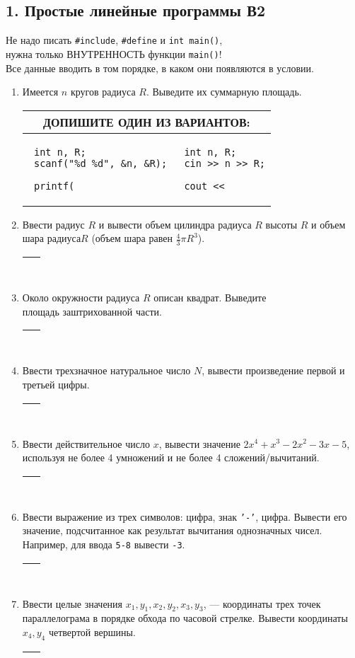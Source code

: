 \documentclass{article}
\newcommand{\answerbox}[1][1.9cm]{\par\begin{tabular}{|p{.92\textwidth}|}
 \hline
 ~\linebreak\vskip#1\mbox{}
 \\
 \hline
\end{tabular}}
\begin{document}
\pagestyle{empty}
\abovedisplayskip=0pt

\subsection*{1. Простые линейные программы \hfill В2}

Не надо писать \texttt{\#include}, \texttt{\#define} и \texttt{int main()}, \\нужна только ВНУТРЕННОСТЬ функции \texttt{main()}! \\Все данные вводить в том порядке, в каком они появляются в условии.

\begin{enumerate}[left=0pt .. \parindent]
\item
Имеется $n$ кругов радиуса $R$. Выведите их суммарную площадь.
\\
\setlength\partopsep{-\topsep}
\begin{tabular}{|p{}@{}|@{}p{}|}
\hline
\multicolumn{2}{|c|}{ДОПИШИТЕ ОДИН ИЗ ВАРИАНТОВ:}
\\
\hline
 \begin{verbatim}
 int n, R;
 scanf("%d %d", &n, &R);
 
 printf( 
 \end{verbatim}
&
 \begin{verbatim}
 int n, R;
 cin >> n >> R;

 cout << 
 \end{verbatim}
\\
\hline
\end{tabular}
\item
Ввести радиус $R$ и вывести объем цилиндра радиуса $R$ высоты $R$ и объем шара радиуса$R$ (объем шара равен $\frac{4}{3}\pi R^3$).
\answerbox
\item
Около окружности радиуса $R$ описан квадрат. Выведите \hfill{}\\
площадь заштрихованной части.\\[1mm]
\answerbox
\item
Ввести трехзначное натуральное число $N$, вывести произведение первой и третьей цифры.
\answerbox
\item
Ввести действительное число $x$, вывести значение $2x^4+x^3-2x^2-3x-5$, используя не более 4 умножений и не более 4 сложений/вычитаний.
\answerbox
\item
Ввести выражение из трех символов: цифра, знак \texttt{'-'}, цифра. Вывести его значение, подсчитанное как результат вычитания однозначных чисел. Например, для ввода \texttt{5-8} вывести \texttt{-3}.
\answerbox
\item
Ввести целые значения $x_1, y_1, x_2, y_2, x_3, y_3$, --- координаты трех точек параллелограма в порядке обхода по часовой стрелке. Вывести координаты $x_4, y_4$ четвертой вершины. 
\answerbox[7.4cm]
\end{enumerate}
\end{document}
